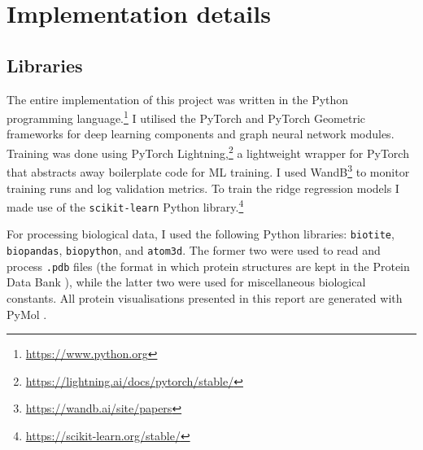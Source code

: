 \section{Implementation details}

\subsection{Libraries}
The entire implementation of this project was written in the Python programming language.\footnote{\url{https://www.python.org}} I utilised the PyTorch \cite{paszke2019pytorch} and PyTorch Geometric \cite{pyg} frameworks for deep learning components and graph neural network modules. Training was done using PyTorch Lightning,\footnote{\url{https://lightning.ai/docs/pytorch/stable/}} a lightweight wrapper for PyTorch that abstracts away boilerplate code for ML training. I used WandB\footnote{\url{https://wandb.ai/site/papers}} to monitor training runs and log validation metrics. To train the ridge regression models I made use of the \texttt{scikit-learn} Python library.\footnote{\url{https://scikit-learn.org/stable/}}


For processing biological data, I used the following Python libraries: \texttt{biotite}, \texttt{biopandas}, \texttt{biopython}, and \texttt{atom3d}. The former two were used to read and process \texttt{.pdb} files (the format in which protein structures are kept in the Protein Data Bank \cite{rcsb_pdb}), while the latter two were used for miscellaneous biological constants. All protein visualisations presented in this report are generated with PyMol \cite{pymol}.
